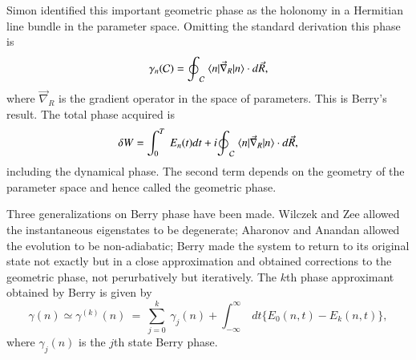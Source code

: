 Simon \cite{key2} identified this important geometric phase as the holonomy in a Hermitian line bundle in the parameter space. Omitting the standard derivation this phase is  
\begin{equation}
{\gamma}_n({\cal{C}})= {\oint}_{\cal{C}}\ \langle n|{\vec{\nabla}}_R|n\rangle \cdot d\vec{R}, \label{chap4-eq1}
\end{equation}
where ${\vec{\nabla}}_R$ is the gradient operator in the space of parameters. This is Berry's result. The total phase 
acquired is 
\begin{equation}
\delta W= \int_0^T\ E_n(t)dt+i{\oint}_{\cal{C}}\ \langle n|{\vec{\nabla}}_R|n\rangle \cdot d\vec{R},\label{chap4-eq2}
\end{equation}
including the dynamical phase. The second term depends on the geometry of the parameter space and hence called the 
geometric phase.  

Three generalizations on Berry phase have been made. Wilczek and Zee \cite{key3} allowed the instantaneous eigenstates to be  degenerate; Aharonov and Anandan \cite{key4} allowed the evolution to be non-adiabatic; Berry \cite{key5} made the system to return  to its original state not exactly but in a close approximation and obtained corrections to the geometric phase,  not perurbatively but iteratively. The $k$th phase approximant obtained by Berry \cite{key5} is given by 
\begin{equation}
\gamma (n)\simeq{\gamma}^{(k)}(n)\ =\ \sum_{j=0}^k\ {\gamma}_j(n)+\int_{-\infty}^{\infty}\ dt\{E_0(n,t)- E_k(n,t)\}, \label{chap4-eq3}
\end{equation}
where ${\gamma}_j(n)$ is the $j$th state Berry phase.

